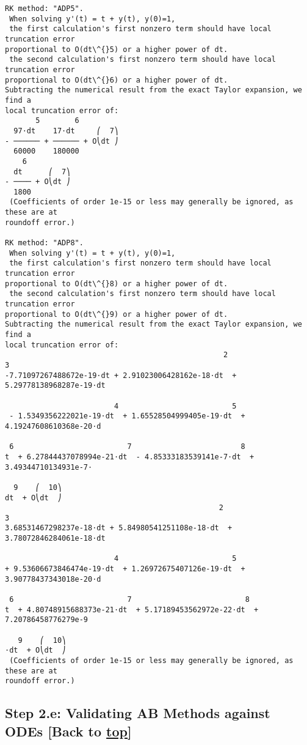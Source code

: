 \documentclass[landscape,letterpaper,10pt,english]{article}
\begin{document}
\begin{Verbatim}[commandchars=\\\{\}]
RK method: "ADP5".
 When solving y'(t) = t + y(t), y(0)=1,
 the first calculation's first nonzero term should have local truncation error
proportional to O(dt\^{}5) or a higher power of dt.
 the second calculation's first nonzero term should have local truncation error
proportional to O(dt\^{}6) or a higher power of dt.
Subtracting the numerical result from the exact Taylor expansion, we find a
local truncation error of:
       5        6
  97⋅dt    17⋅dt     ⎛  7⎞
- ────── + ────── + O⎝dt ⎠
  60000    180000
    6
  dt      ⎛  7⎞
- ──── + O⎝dt ⎠
  1800
 (Coefficients of order 1e-15 or less may generally be ignored, as these are at
roundoff error.)

RK method: "ADP8".
 When solving y'(t) = t + y(t), y(0)=1,
 the first calculation's first nonzero term should have local truncation error
proportional to O(dt\^{}8) or a higher power of dt.
 the second calculation's first nonzero term should have local truncation error
proportional to O(dt\^{}9) or a higher power of dt.
Subtracting the numerical result from the exact Taylor expansion, we find a
local truncation error of:
                                                  2                          3
-7.71097267488672e-19⋅dt + 2.91023006428162e-18⋅dt  + 5.29778138968287e-19⋅dt

                         4                          5
 - 1.5349356222021e-19⋅dt  + 1.65528504999405e-19⋅dt  + 4.19247608610368e-20⋅d

 6                          7                         8
t  + 6.27844437078994e-21⋅dt  - 4.85333183539141e-7⋅dt  + 3.49344710134931e-7⋅

  9    ⎛  10⎞
dt  + O⎝dt  ⎠
                                                 2                          3
3.68531467298237e-18⋅dt + 5.84980541251108e-18⋅dt  + 3.78072846284061e-18⋅dt

                         4                          5
+ 9.53606673846474e-19⋅dt  + 1.26972675407126e-19⋅dt  + 3.90778437343018e-20⋅d

 6                          7                          8
t  + 4.80748915688373e-21⋅dt  + 5.17189453562972e-22⋅dt  + 7.20786458776279e-9

   9    ⎛  10⎞
⋅dt  + O⎝dt  ⎠
 (Coefficients of order 1e-15 or less may generally be ignored, as these are at
roundoff error.)

    \end{Verbatim}

    \hypertarget{step-2.e-validating-ab-methods-against-odes-back-to-top}{%
\subsection{\texorpdfstring{Step 2.e: Validating AB Methods against ODEs
{[}Back to
\hyperref[toc]{top}{]}}{Step 2.e: Validating AB Methods against ODEs {[}Back to {]}}}\label{step-2.e-validating-ab-methods-against-odes-back-to-top}}
\end{document}
